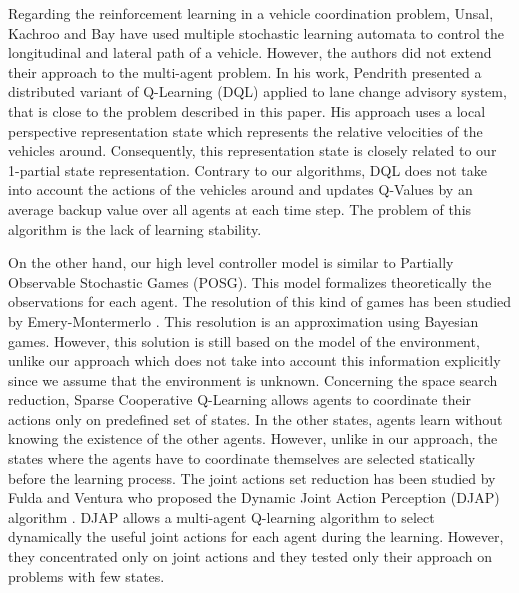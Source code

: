 Regarding the reinforcement learning in a vehicle coordination problem, Unsal, Kachroo and Bay \cite{CACC1999} have used multiple stochastic learning automata to control the longitudinal and lateral path of a vehicle. However, the authors did not extend their approach to the multi-agent problem. In his work, Pendrith \cite{DistributedRL-Traffic2000} presented a distributed variant of Q-Learning (DQL) applied to lane change advisory system, that is close to the problem described in this paper. His approach uses a local perspective representation state which represents the relative velocities of the vehicles around. Consequently, this representation state is closely related to our 1-partial state representation. Contrary to our algorithms, DQL does not take into account the actions of the vehicles around and updates Q-Values by an average backup value over all agents at each time step. The problem of this algorithm is the lack of learning stability.

On the other hand, our high level controller model is similar to Partially Observable Stochastic Games (POSG). This model formalizes theoretically the observations for each agent. The resolution of this kind of games has been studied by Emery-Montermerlo \cite{GameControl2005}. This resolution is an approximation using Bayesian games. However, this solution is still based on the model of the environment, unlike our approach which does not take into account this information explicitly since we assume that the environment is unknown. Concerning the space search reduction, Sparse Cooperative Q-Learning \cite{Sparse2004} allows agents to coordinate their actions only on predefined set of states. In the other states, agents learn without knowing the existence of the other agents. However, unlike in our approach, the states where the agents have to coordinate themselves are selected statically before the learning process. The joint actions set reduction has been studied by Fulda and Ventura who proposed the Dynamic Joint Action Perception (DJAP) algorithm \cite{JointAction2003}. DJAP allows a multi-agent Q-learning algorithm to select dynamically the useful joint actions for each agent during the learning. However, they concentrated only on joint actions and they tested only their approach on problems with few states.

